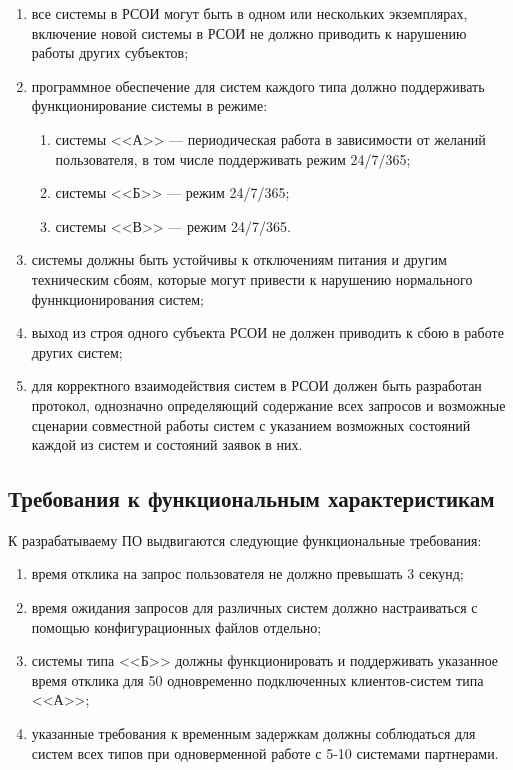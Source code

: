  \begin{enumerate}
 	\item все системы в РСОИ могут быть в одном или нескольких экземплярах, включение новой системы в РСОИ не должно приводить к нарушению работы других субъектов;
 	\item программное обеспечение для систем каждого типа должно 	поддерживать функционирование системы в режиме:
 		\begin{enumerate}
 			\item системы <<А>> --- периодическая работа в зависимости от желаний пользователя, в том числе поддерживать режим 24/7/365;
 			\item системы <<Б>> --- режим 24/7/365;
 			\item системы <<В>> --- режим 24/7/365.
 		\end{enumerate}
 	\item системы должны быть устойчивы к отключениям питания и другим техническим сбоям, которые могут привести к нарушению нормального фуннкционирования систем;
 	\item выход из строя одного субъекта РСОИ не должен приводить к сбою в работе других систем;
 	\item для корректного взаимодействия систем в РСОИ должен быть разработан протокол, однозначно определяющий содержание всех запросов и возможные сценарии совместной работы систем с указанием возможных состояний каждой из систем и состояний заявок в них.
 \end{enumerate}

 \subsection{Требования к функциональным характеристикам}
 К разрабатываему ПО выдвигаются следующие функциональные требования:
 \begin{enumerate}
 	\item время отклика на запрос пользователя не должно превышать 3 секунд;
 	\item время ожидания запросов для различных систем должно настраиваться с помощью конфигурационных файлов отдельно;
 	\item системы типа <<Б>> должны функционировать и поддерживать указанное время отклика для 50 одновременно подключенных клиентов-систем типа <<А>>;
 	\item указанные требования к временным задержкам должны соблюдаться для систем всех типов при одноверменной работе с 5-10 системами партнерами.
 \end{enumerate}

